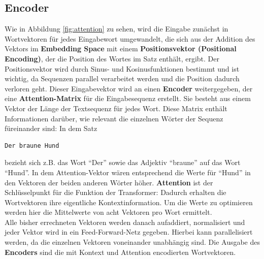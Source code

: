 \subsection*{Encoder}
Wie in Abbildung \ref{fig:attention} zu sehen, wird die Eingabe zun\"achst in Wortvektoren f\"ur jedes Eingabewort umgewandelt, die sich aus der Addition des Vektors im \textbf{Embedding Space} mit einem \textbf{Positionsvektor (Positional Encoding)}, der die Position des Wortes im Satz enth\"alt, ergibt. Der Positionsvektor wird durch Sinus- und Kosinusfunktionen bestimmt und ist wichtig, da Sequenzen parallel verarbeitet werden und die Position dadurch verloren geht. Dieser Eingabevektor wird an einen \textbf{Encoder} weitergegeben, der eine \textbf{Attention-Matrix} f\"ur die Eingabesequenz erstellt. Sie besteht aus einem Vektor der L\"ange der Textsequenz f\"ur jedes Wort. Diese Matrix enth\"alt Informationen dar\"uber, wie relevant die einzelnen W\"orter der Sequenz f\"ureinander sind: In dem Satz
\begin{verbatim} 
Der braune Hund
\end{verbatim} 
bezieht sich z.B. das Wort "`Der"' sowie das Adjektiv "`braune"' auf das Wort "`Hund"'. In dem Attention-Vektor w\"aren entsprechend die Werte f\"ur "`Hund"' in den Vektoren der beiden anderen W\"orter h\"oher. \textbf{Attention} ist der Schl\"usselpunkt f\"ur die Funktion der Transformer: Dadurch erhalten die Wortvektoren ihre eigentliche Kontextinformation. Um die Werte zu optimieren werden hier die Mittelwerte von acht Vektoren pro Wort ermittelt.\\
Alle bisher errechneten Vektoren werden danach aufaddiert, normalisiert und jeder Vektor wird in ein Feed-Forward-Netz gegeben. Hierbei kann parallelisiert werden, da die einzelnen Vektoren voneinander unabh\"angig sind. Die Ausgabe des \textbf{Encoders} sind die mit Kontext und Attention encodierten Wortvektoren.\\

